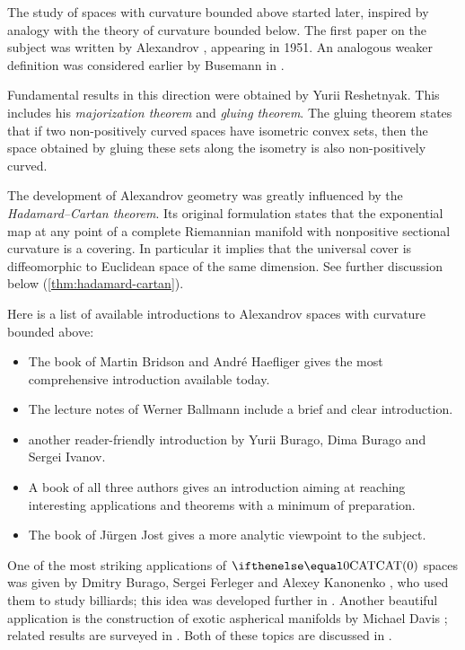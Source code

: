 The study of  spaces with curvature bounded above started later,
inspired by analogy with the theory of curvature bounded below.
The first paper on the subject was written by Alexandrov \cite{alexandrov:strong-angle}, appearing in 1951.
An analogous weaker definition was considered earlier by Busemann in \cite{busemann-CBA}.

Fundamental results in this direction were obtained by Yurii Reshetnyak.
This includes his \emph{majorization theorem} and \emph{gluing theorem}.
The gluing theorem states that if two non-positively curved spaces have isometric convex sets, then the space obtained by gluing these sets along the isometry is also non-positively curved.

The development of Alexandrov geometry was greatly influenced by the \emph{Hadamard--Cartan theorem}.
Its original formulation states that the exponential map at any point of a complete Riemannian manifold with nonpositive sectional curvature is a covering.
In particular it implies that the universal cover is diffeomorphic to Euclidean space of the same dimension. 
See further discussion below (\ref{thm:hadamard-cartan}).

Here is a list of available introductions to Alexandrov spaces with curvature bounded above: 
\begin{itemize}
\item The book of Martin Bridson and Andr\'e Haefliger \cite{BH} gives the most comprehensive introduction available today. 
\item The lecture notes of Werner Ballmann \cite{ballmann:lectures} include a brief 
and clear
introduction.
\item \cite[Chapter 9]{BBI} another reader-friendly introduction by Yurii Burago, Dima Burago and Sergei Ivanov.
\item A book of all three authors \cite{AKP-CAT} gives an introduction aiming at reaching interesting applications and theorems with a minimum of preparation.
\item The book of J\"{u}rgen Jost \cite{jost} gives a more analytic viewpoint to the subject.
\end{itemize}

One of the most striking applications of $\CAT0$ spaces was given by Dmitry Burago, Sergei Ferleger and Alexey Kanonenko \cite{BFK1},
who used them to study billiards; this idea was developed further in \cite{BFK2,BFK3,BFK4,BFK5,BFK6}. 
Another beautiful application is the construction of exotic aspherical manifolds by Michael Davis \cite{davis:aspherical}; related results are surveyed in \cite{davis:exotic,charney-davis}.
Both of these topics are discussed in \cite{AKP-CAT}.

